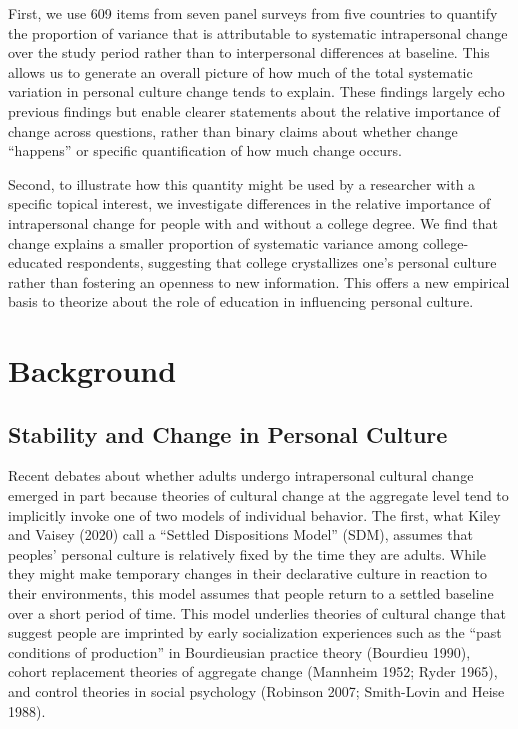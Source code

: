 \documentclass[
  12pt,
]{article}
\begin{document}
First, we use 609 items from seven panel surveys from five countries to
quantify the proportion of variance that is attributable to systematic
intrapersonal change over the study period rather than to interpersonal
differences at baseline. This allows us to generate an overall picture
of how much of the total systematic variation in personal culture change
tends to explain. These findings largely echo previous findings but
enable clearer statements about the relative importance of change across
questions, rather than binary claims about whether change ``happens'' or
specific quantification of how much change occurs.

Second, to illustrate how this quantity might be used by a researcher
with a specific topical interest, we investigate differences in the
relative importance of intrapersonal change for people with and without
a college degree. We find that change explains a smaller proportion of
systematic variance among college-educated respondents, suggesting that
college crystallizes one's personal culture rather than fostering an
openness to new information. This offers a new empirical basis to
theorize about the role of education in influencing personal culture.

\hypertarget{background}{%
\section{Background}\label{background}}

\hypertarget{stability-and-change-in-personal-culture}{%
\subsection{Stability and Change in Personal
Culture}\label{stability-and-change-in-personal-culture}}

Recent debates about whether adults undergo intrapersonal cultural
change emerged in part because theories of cultural change at the
aggregate level tend to implicitly invoke one of two models of
individual behavior. The first, what Kiley and Vaisey (2020) call a
``Settled Dispositions Model'' (SDM), assumes that peoples' personal
culture is relatively fixed by the time they are adults. While they
might make temporary changes in their declarative culture in reaction to
their environments, this model assumes that people return to a settled
baseline over a short period of time. This model underlies theories of
cultural change that suggest people are imprinted by early socialization
experiences such as the ``past conditions of production'' in
Bourdieusian practice theory (Bourdieu 1990), cohort replacement
theories of aggregate change (Mannheim 1952; Ryder 1965), and control
theories in social psychology (Robinson 2007; Smith-Lovin and Heise
1988).
\end{document}
